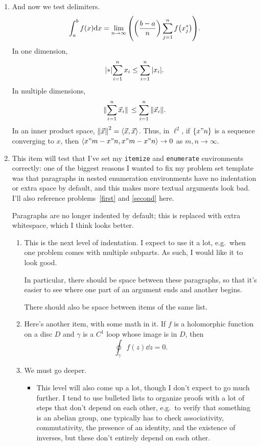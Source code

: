 \documentclass[onesided]{../ccg-pset}
\begin{document}
\begin{enumerate}
\item And now we test delimiters. \label{second}
\[\int_a^b f(x)\dd x = \lim_{n\to\infty}\qty( \qty( \frac{b-a}{n} )\sum_{j=1}^n f\qty( x_j^* ) ).\]
In one dimension,
\begin{equation}
\qty| * |{\sum_{i=1}^n x_i} \le \sum_{i=1}^n \qty| x_i |.
\end{equation}
In multiple dimensions,
\begin{equation}
\norm*{\sum_{i=1}^n \vec x_i} \le \sum_{i=1}^n\norm{\vec x_i}.
\end{equation}
In an inner product space, \(\norm{\vec x}^2 = \left\langle \vec x,\vec x \right\rangle\). Thus, in \(\ell^2\), if \(\qty{ x"n }\) is a
sequence converging to \(x\), then \(\left\langle x"m-x"n,x"m-x"n \right\rangle\to 0\) as \(m,n\to\infty\).
\item This item will test that I've set my \verb+itemize+ and \verb+enumerate+ environments correctly: one of the
biggest reasons I wanted to fix my problem set template was that paragraphs in nested enumeration environments
have no indentation or extra space by default, and this makes more textual arguments look bad. I'll also reference
problems~\ref{first} and \ref{second} here.

Paragraphs are no longer indented by default; this is replaced with extra whitespace, which I think looks better.
\begin{enumerate}
	\item This is the next level of indentation. I expect to use it a lot, e.g.\ when one problem comes with
	multiple subparts. As such, I would like it to look good.

	In particular, there should be space between these paragraphs, so that it's easier to see where one part of an
	argument ends and another begins.

	There should also be space between items of the same list.
	\item Here's another item, with some math in it. If \(f\) is a holomorphic function on a disc \(D\) and
	\(\gamma\) is a \(C^1\) loop whose image is in \(D\), then
	\[\oint_\gamma f(z)\dd z = 0.\]
	\item We must go deeper.
	\begin{itemize}
		\item This level will also come up a lot, though I don't expect to go much further. I tend to use bulleted
		lists to organize proofs with a lot of steps that don't depend on each other, e.g.\ to verify that
		something is an abelian group, one typically has to check associativity, commutativity, the presence of an
		identity, and the existence of inverses, but these don't entirely depend on each other.


\end{itemize}
\end{enumerate}
\end{enumerate}
\end{document}
